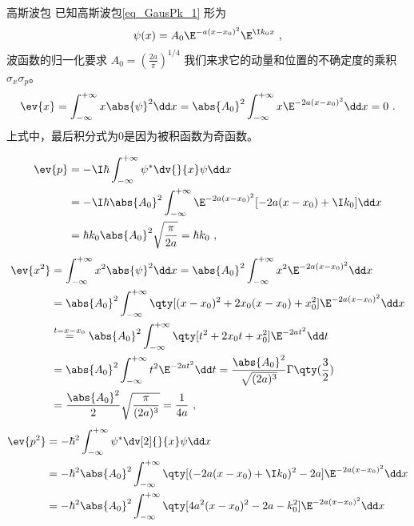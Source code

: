 \begin{example}{高斯波包}\label{ex_Uncert_1}
已知高斯波包\autoref{eq_GausPk_1}  形为
\begin{equation}
\psi(x)=A_0\E^{-a(x-x_0)^2}\E^{\I k_0x}~,
\end{equation}
波函数的归一化要求 $A_0=(\frac{2a}{\pi})^{1/4}$
我们来求它的动量和位置的不确定度的乘积 $\sigma_x\sigma_p$。
\begin{equation}\label{eq_Uncert_4}
\ev{x}=\int_{-\infty}^{+\infty}x\abs{\psi}^2\dd x=\abs{A_0}^2\int_{-\infty}^{+\infty}x\E^{-2a(x-x_0)^2}\dd x=0~.
\end{equation}
上式中，最后积分式为0是因为被积函数为奇函数。

\begin{equation}
\begin{aligned}
\ev{p}&=-\I\hbar\int_{-\infty}^{+\infty}\psi^{*}\dv{}{x}\psi\dd x\\
&=-\I\hbar\abs{A_0}^2\int_{-\infty}^{+\infty}\E^{-2a(x-x_0)^2}[-2a(x-x_0)+\I k_0]\dd x\\
&=\hbar k_0\abs{A_0}^2\sqrt{\frac{\pi}{2a}}=\hbar k_0~,
\end{aligned}
\end{equation}
\begin{equation}
\begin{aligned}
\ev{x^2}&=\int_{-\infty}^{+\infty}x^2\abs{\psi}^2\dd x=\abs{A_0}^2\int_{-\infty}^{+\infty}x^2\E^{-2a(x-x_0)^2}\dd x\\
&=\abs{A_0}^2\int_{-\infty}^{+\infty}\qty[(x-x_0)^2+2x_0(x-x_0)+x_0^2]\E^{-2a(x-x_0)^2}\dd x\\
&\overset{t=x-x_0}{=}\abs{A_0}^2\int_{-\infty}^{+\infty}\qty[t^2+2x_0t+x_0^2]\E^{-2at^2}\dd t\\
&=\abs{A_0}^2\int_{-\infty}^{+\infty}t^2\E^{-2at^2}\dd t
=\frac{\abs{A_0}^2}{\sqrt{(2a)^3}}\Gamma\qty(\frac{3}{2})\\
&=\frac{\abs{A_0}^2}{2}\sqrt{\frac{\pi}{(2a)^3}}=\frac{1}{4a}~,
\end{aligned}
\end{equation}
\begin{equation}
\begin{aligned}
\ev{p^2}&=-\hbar^2 \int_{-\infty}^{+\infty}\psi^{*}\dv[2]{}{x}\psi\dd x\\
&=-\hbar^2\abs{A_0}^2\int_{-\infty}^{+\infty}\qty[(-2a(x-x_0)+\I k_0)^2-2a]\E^{-2a(x-x_0)^2}\dd x\\
&=-\hbar^2\abs{A_0}^2\int_{-\infty}^{+\infty}\qty[4a^2(x-x_0)^2-2a-k_0^2]\E^{-2a(x-x_0)^2}\dd x\\

\end{aligned}
\end{equation}
\end{example}
